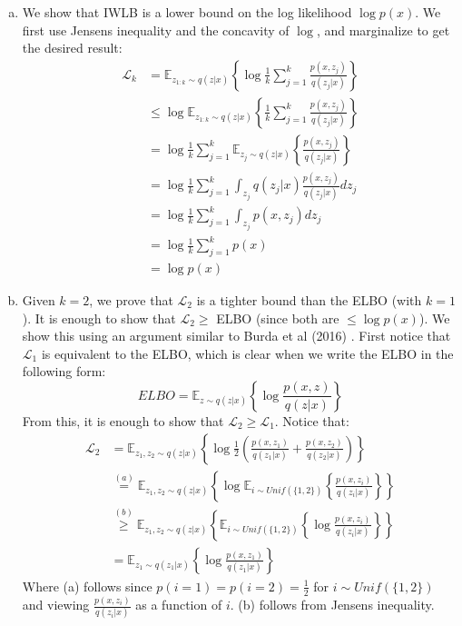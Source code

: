 \documentclass[paper=a4, fontsize=11pt]{scrartcl} %
\numberwithin{equation}{section} %
\numberwithin{figure}{section} %
\numberwithin{table}{section} %
\newcommand{\Ex}[2]{\mathbb{E}_{#1}\left\{#2\right\}}
\begin{document}
\begin{enumerate}[(a)]
	\item We show that IWLB is a lower bound on the log likelihood $\log p(x)$. We first use Jensens inequality and the concavity of $\log$, and marginalize to get the desired result:
	\begin{align*}
	\mathcal{L}_k &= \Ex{z_{1:k}\sim q(z|x)}{\log \frac{1}{k} \sum_{j=1}^k \frac{p(x,z_j)}{q(z_j|x)}} \\
	&\le  \log \Ex{z_{1:k}\sim q(z|x)}{ \frac{1}{k} \sum_{j=1}^k \frac{p(x,z_j)}{q(z_j|x)}}\\
	&= \log \frac{1}{k} \sum_{j=1}^k \Ex{z_{j}\sim q(z|x)}{  \frac{p(x,z_j)}{q(z_j|x)}}\\
	&= \log \frac{1}{k} \sum_{j=1}^k \int_{z_{j}}q(z_j|x)  \frac{p(x,z_j)}{q(z_j|x)}dz_j\\
	&= \log \frac{1}{k} \sum_{j=1}^k \int_{z_{j}} p(x,z_j)dz_j\\
	&= \log \frac{1}{k} \sum_{j=1}^k p(x) \\
	&= \log p(x)
	\end{align*}
	
	\item Given $k = 2$, we prove that $\mathcal{L}_2$ is a tighter bound than the ELBO (with $k = 1$). It is enough to show that $\mathcal{L}_2 \ge$ ELBO (since both are $\le \log p(x)$). We show this using an argument similar to Burda et al (2016) \cite{DBLP:journals/corr/BurdaGS15}	. First notice that $\mathcal{L}_1$ is equivalent to the ELBO, which is clear when we write the ELBO in the following form:
	$$ELBO = \Ex{z\sim q(z|x)}{\log \frac{p(x,z)}{q(z|x)}}$$
	From this, it is enough to show that $\mathcal{L}_2 \ge \mathcal{L}_1$. Notice that:
	\begin{align*}
	\mathcal{L}_2 &= \Ex{z_{1},z_2\sim q(z|x)}{\log \frac{1}{2}\left( \frac{p(x,z_1)}{q(z_1|x)} + \frac{p(x,z_2)}{q(z_2|x)}\right)}\\
	&\overset{(a)}{=} \Ex{z_{1},z_2\sim q(z|x)}{\log \Ex{i\sim Unif(\{1,2\})}{\frac{p(x,z_i)}{q(z_i|x)}}}\\
	&\overset{(b)}{\ge} \Ex{z_{1},z_2\sim q(z|x)}{\Ex{i\sim Unif(\{1,2\})}{\log\frac{p(x,z_i)}{q(z_i|x)}}}\\
	&= \Ex{z_{1}\sim q(z_1|x)}{\log\frac{p(x,z_1)}{q(z_1|x)}}
	\end{align*}
	Where (a) follows since $p(i=1)=p(i=2)=\frac{1}{2}$ for $i\sim Unif(\{1,2\})$ and viewing $\frac{p(x,z_i)}{q(z_i|x)}$ as a function of $i$. (b) follows from Jensens inequality.
\end{enumerate}
\end{document}
